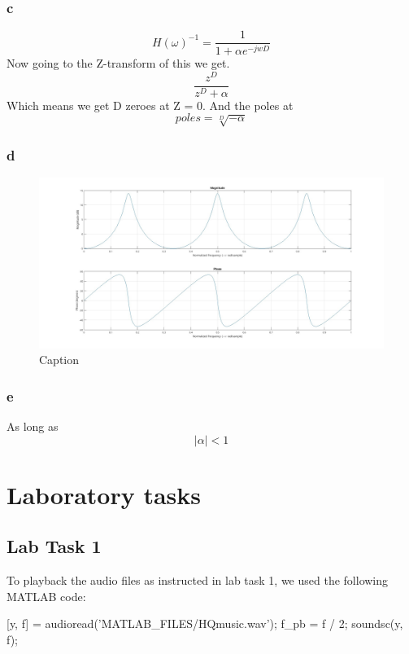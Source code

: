 \documentclass[a4paper,11pt]{article}
\begin{document}
\subsubsection{c}
\[
H(\omega)^{-1} = \frac{1}{1 + \alpha e^{-jwD}}
\]
Now going to the Z-transform of this we get.
\[
\frac{z^D}{z^D + \alpha}
\]
Which means we get D zeroes at Z = 0. And the poles at
\[
poles = \sqrt[D]{-\alpha}
\]
\subsubsection{d}
\begin{figure}[H]
    \hspace{-45pt}\includegraphics[scale=0.28]{./images/prep-3d.jpg}
    \caption{Caption}
    \label{fig:my_label}
\end{figure}
\subsubsection{e}
As long as 
\[
|\alpha| < 1
\]

\section{Laboratory tasks}

\subsection{Lab Task 1}
To playback the audio files as instructed in lab task 1, we used the following MATLAB code:
\begin{ffcode} 
[y, f] = audioread('MATLAB_FILES/HQmusic.wav');
f_pb = f / 2;
soundsc(y, f);
\end{ffcode}
\end{document}
